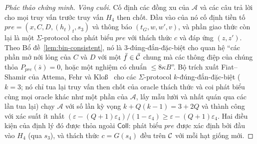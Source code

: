 \begin{proof}[Phác thảo chứng minh]
\emph{Vòng cuối.} Cố định các đồng xu của $\mathcal A$ và các câu trả lời cho
mọi truy vấn trước truy vấn $H_4$ then chốt. Đầu vào của nó cố định tiền tố
$\mathit{pre}=(x,C,D,(h_t)_t,s_3)$ và thông báo $(t_G,w,w',v)$, và phần giao
thức còn lại là một $\Sigma$-protocol cho phát biểu $\mathit{pre}$ với thách
thức $c$ và đáp ứng $(z,z')$. Theo Bổ đề~\ref{lem:bin-consistent}, nó là
$3$-đúng-đắn-đặc-biệt cho quan hệ ``các phần mở nới lỏng của $C$ và $D$ với
một $\bar f\in\bar{\mathcal{C}}$ chung mà các thông điệp của chúng thỏa $P_{\mathit{pre}}(\bar s)=0$,
hoặc một nghiệm \MSIS{} có chuẩn $\le8\kappa B$''. Bộ trích xuất Fiat--Shamir
của Attema, Fehr và Klo{\ss}~\cite{ref:afk22} cho các
$\Sigma$-protocol $k$-đúng-đắn-đặc-biệt ($k=3$; nó chỉ tua lại truy vấn then
chốt của oracle thách thức và coi phát biểu cùng mọi oracle khác như một phần
của $\mathcal A$, lấy mẫu lười và nhất quán qua các lần tua lại) chạy
$\mathcal A$ với số lần kỳ vọng $k+Q(k-1)=3+2Q$ và
thành công với xác suất ít nhất
$(\varepsilon-(Q+1)\varepsilon_4)/(1-\varepsilon_4)\ge\varepsilon-(Q+1)\varepsilon_4$.
Hai điều kiện của định lý đó được thỏa ngoài $\mathsf{Coll}$: phát biểu
$\mathit{pre}$ được xác định bởi đầu vào $H_4$ (qua $s_3$), và thách thức
$c=G(s_4)$ đều trên $\mathcal{C}$ với mỗi hạt giống mới.


\end{proof}
